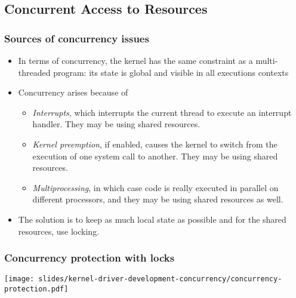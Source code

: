 \subsection{Concurrent Access to Resources}

\begin{frame}
  \frametitle{Sources of concurrency issues}
  \begin{itemize}
  \item In terms of concurrency, the kernel has the same constraint
    as a multi-threaded program: its state is global and visible
    in all executions contexts
  \item Concurrency arises because of
    \begin{itemize}
    \item \emph{Interrupts}, which interrupts the current thread to
      execute an interrupt handler. They may be using shared
      resources.
    \item \emph{Kernel preemption}, if enabled, causes the kernel to
      switch from the execution of one system call to another. They
      may be using shared resources.
    \item \emph{Multiprocessing}, in which case code is really
      executed in parallel on different processors, and they may be
      using shared resources as well.
    \end{itemize}
  \item The solution is to keep as much local state as possible and
    for the shared resources, use locking.
  \end{itemize}
\end{frame}

\begin{frame}
  \frametitle{Concurrency protection with locks}
  \begin{center}
    \texttt{[image: slides/kernel-driver-development-concurrency/concurrency-protection.pdf]}
  \end{center}
\end{frame}

